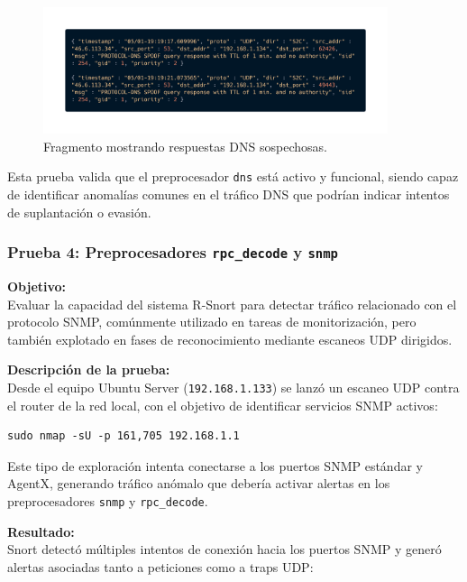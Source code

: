 \documentclass[11pt,a4paper,twoside]{report}
\begin{document}
\begin{figure}[H]
	\centering
	\includegraphics[width=0.9\textwidth]{pruebas_bien/seccion_uno/3.png}
	\caption{Fragmento mostrando respuestas DNS sospechosas.}
\end{figure}

Esta prueba valida que el preprocesador \texttt{dns} está activo y funcional, siendo capaz de identificar anomalías comunes en el tráfico DNS que podrían indicar intentos de suplantación o evasión.

\subsubsection*{Prueba 4: Preprocesadores \texttt{rpc\_decode} y \texttt{snmp}}

\textbf{Objetivo:} \\
Evaluar la capacidad del sistema R-Snort para detectar tráfico relacionado con el protocolo SNMP, comúnmente utilizado en tareas de monitorización, pero también explotado en fases de reconocimiento mediante escaneos UDP dirigidos.\newline

\textbf{Descripción de la prueba:} \\
Desde el equipo Ubuntu Server (\texttt{192.168.1.133}) se lanzó un escaneo UDP contra el router de la red local, con el objetivo de identificar servicios SNMP activos:

\begin{lstlisting}[style=commandstyle]
	sudo nmap -sU -p 161,705 192.168.1.1
\end{lstlisting}

Este tipo de exploración intenta conectarse a los puertos SNMP estándar y AgentX, generando tráfico anómalo que debería activar alertas en los preprocesadores \texttt{snmp} y \texttt{rpc\_decode}.\newline

\textbf{Resultado:} \\
Snort detectó múltiples intentos de conexión hacia los puertos SNMP y generó alertas asociadas tanto a peticiones como a traps UDP:
\end{document}
